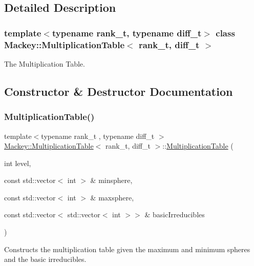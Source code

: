 \subsection{Detailed Description}
\subsubsection*{template$<$typename rank\+\_\+t, typename diff\+\_\+t$>$\newline
class Mackey\+::\+Multiplication\+Table$<$ rank\+\_\+t, diff\+\_\+t $>$}

The Multiplication Table. 

\subsection{Constructor \& Destructor Documentation}
\mbox{\label{classMackey_1_1MultiplicationTable_a8530e27d8d2c3c755eb5041a2ee8c35b}} 
\subsubsection{\texorpdfstring{Multiplication\+Table()}{MultiplicationTable()}}
{\footnotesize\ttfamily template$<$typename rank\+\_\+t , typename diff\+\_\+t $>$ \\
\hyperlink{classMackey_1_1MultiplicationTable}{Mackey\+::\+Multiplication\+Table}$<$ rank\+\_\+t, diff\+\_\+t $>$\+::\hyperlink{classMackey_1_1MultiplicationTable}{Multiplication\+Table} (\begin{DoxyParamCaption}\item[{int}]{level,  }\item[{const std\+::vector$<$ int $>$ \&}]{minsphere,  }\item[{const std\+::vector$<$ int $>$ \&}]{maxsphere,  }\item[{const std\+::vector$<$ std\+::vector$<$ int $>$$>$ \&}]{basic\+Irreducibles }\end{DoxyParamCaption})\hspace{0.3cm}{\ttfamily [protected]}}



Constructs the multiplication table given the maximum and minimum spheres and the basic irreducibles. 

